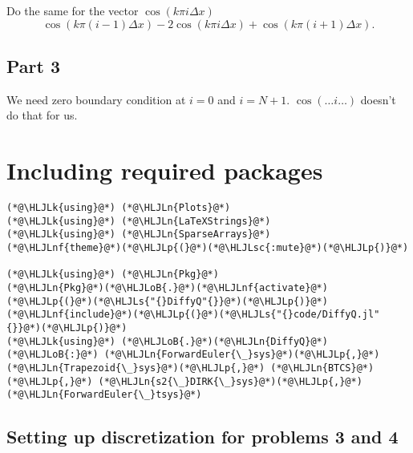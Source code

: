 \documentclass[12pt,a4paper]{article}
\newcommand{\HLJLk}[1]{\textcolor[RGB]{148,91,176}{\textbf{#1}}}
\newcommand{\HLJLn}[1]{#1}
\newcommand{\HLJLnf}[1]{\textcolor[RGB]{66,102,213}{#1}}
\newcommand{\HLJLs}[1]{\textcolor[RGB]{201,61,57}{#1}}
\newcommand{\HLJLsc}[1]{\textcolor[RGB]{201,61,57}{#1}}
\newcommand{\HLJLoB}[1]{\textcolor[RGB]{102,102,102}{\textbf{#1}}}
\newcommand{\HLJLp}[1]{#1}
\begin{document}
Do the same for the vector $\cos(k\pi i \Delta x)$
\[
  \cos(k\pi(i-1)\Delta x) - 2\cos(k\pi i\Delta x) + \cos(k\pi(i+1) \Delta x)
.\] 

\subsection{Part 3}%
\label{sub:part_3}

We need zero boundary condition at $i=0$ and $i = N+1$.  $\cos(\dots i \dots)$ doesn't do that for us.


\section{Including required packages}

\begin{lstlisting}
(*@\HLJLk{using}@*) (*@\HLJLn{Plots}@*)
(*@\HLJLk{using}@*) (*@\HLJLn{LaTeXStrings}@*)
(*@\HLJLk{using}@*) (*@\HLJLn{SparseArrays}@*)
(*@\HLJLnf{theme}@*)(*@\HLJLp{(}@*)(*@\HLJLsc{:mute}@*)(*@\HLJLp{)}@*)

(*@\HLJLk{using}@*) (*@\HLJLn{Pkg}@*)
(*@\HLJLn{Pkg}@*)(*@\HLJLoB{.}@*)(*@\HLJLnf{activate}@*)(*@\HLJLp{(}@*)(*@\HLJLs{"{}DiffyQ"{}}@*)(*@\HLJLp{)}@*)
(*@\HLJLnf{include}@*)(*@\HLJLp{(}@*)(*@\HLJLs{"{}code/DiffyQ.jl"{}}@*)(*@\HLJLp{)}@*)
(*@\HLJLk{using}@*) (*@\HLJLoB{.}@*)(*@\HLJLn{DiffyQ}@*)(*@\HLJLoB{:}@*) (*@\HLJLn{ForwardEuler{\_}sys}@*)(*@\HLJLp{,}@*) (*@\HLJLn{Trapezoid{\_}sys}@*)(*@\HLJLp{,}@*) (*@\HLJLn{BTCS}@*)(*@\HLJLp{,}@*) (*@\HLJLn{s2{\_}DIRK{\_}sys}@*)(*@\HLJLp{,}@*) (*@\HLJLn{ForwardEuler{\_}tsys}@*)
\end{lstlisting}


\subsection{Setting up discretization for problems 3 and 4}
\end{document}
